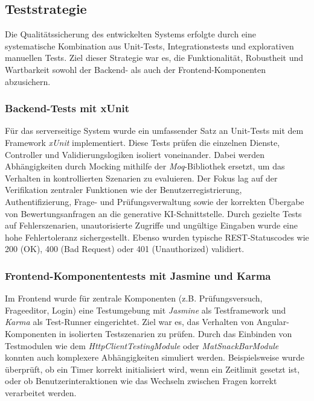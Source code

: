 \documentclass[a4paper,12pt]{article}
\begin{document}
\subsection{Teststrategie}

Die Qualitätssicherung des entwickelten Systems erfolgte durch eine systematische Kombination aus Unit-Tests, Integrationstests und explorativen manuellen Tests. Ziel dieser Strategie war es, die Funktionalität, Robustheit und Wartbarkeit sowohl der Backend- als auch der Frontend-Komponenten abzusichern.

\subsubsection{Backend-Tests mit xUnit}
Für das serverseitige System wurde ein umfassender Satz an Unit-Tests mit dem Framework \textit{xUnit} implementiert. Diese Tests prüfen die einzelnen Dienste, Controller und Validierungslogiken isoliert voneinander. Dabei werden Abhängigkeiten durch Mocking mithilfe der \textit{Moq}-Bibliothek ersetzt, um das Verhalten in kontrollierten Szenarien zu evaluieren. Der Fokus lag auf der Verifikation zentraler Funktionen wie der Benutzerregistrierung, Authentifizierung, Frage- und Prüfungsverwaltung sowie der korrekten Übergabe von Bewertungsanfragen an die generative KI-Schnittstelle. Durch gezielte Tests auf Fehlerszenarien, unautorisierte Zugriffe und ungültige Eingaben wurde eine hohe Fehlertoleranz sichergestellt. Ebenso wurden typische REST-Statuscodes wie 200 (OK), 400 (Bad Request) oder 401 (Unauthorized) validiert.

\subsubsection{Frontend-Komponententests mit Jasmine und Karma}
Im Frontend wurde für zentrale Komponenten (z.B. Prüfungsversuch, Frageeditor, Login) eine Testumgebung mit \textit{Jasmine} als Testframework und \textit{Karma} als Test-Runner eingerichtet. Ziel war es, das Verhalten von Angular-Komponenten in isolierten Testszenarien zu prüfen. Durch das Einbinden von Testmodulen wie dem \textit{HttpClientTestingModule} oder \textit{MatSnackBarModule} konnten auch komplexere Abhängigkeiten simuliert werden. Beispielsweise wurde überprüft, ob ein Timer korrekt initialisiert wird, wenn ein Zeitlimit gesetzt ist, oder ob Benutzerinteraktionen wie das Wechseln zwischen Fragen korrekt verarbeitet werden.
\end{document}

